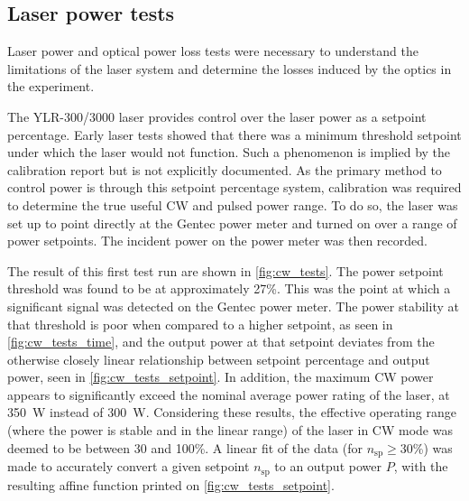 
        \subsection{Laser power tests}
            Laser power and optical power loss tests were necessary to understand the limitations of the laser system and determine the losses induced by the optics in the experiment.

            The YLR-300/3000 laser provides control over the laser power as a setpoint percentage. Early laser tests showed that there was a minimum threshold setpoint under which the laser would not function. Such a phenomenon is implied by the calibration report but is not explicitly documented. As the primary method to control power is through this setpoint percentage system, calibration was required to determine the true useful CW and pulsed power range. To do so, the laser was set up to point directly at the Gentec power meter and turned on over a range of power setpoints. The incident power on the power meter was then recorded.

            The result of this first test run are shown in \autoref{fig:cw_tests}. The power setpoint threshold was found to be at approximately 27\%. This was the point at which a significant signal was detected on the Gentec power meter. The power stability at that threshold is poor when compared to a higher setpoint, as seen in \autoref{fig:cw_tests_time}, and the output power at that setpoint deviates from the otherwise closely linear relationship between setpoint percentage and output power, seen in \autoref{fig:cw_tests_setpoint}. In addition, the maximum CW power appears to significantly exceed the nominal average power rating of the laser, at \qty{350}{W} instead of \qty{300}{W}. Considering these results, the effective operating range (where the power is stable and in the linear range) of the laser in CW mode was deemed to be between 30 and 100\%. A linear fit of the data (for $n_\mathrm{sp} \geq 30$\%) was made to accurately convert a given setpoint $n_\mathrm{sp}$ to an output power $P$, with the resulting affine function printed on \autoref{fig:cw_tests_setpoint}.

